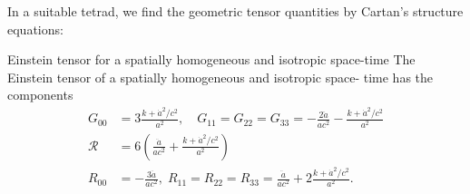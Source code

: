 In a suitable tetrad, we find the geometric tensor quantities by Cartan's structure equations:
\begin{mybox}{Einstein tensor for a spatially homogeneous and isotropic
		space-time}
The Einstein tensor of a spatially homogeneous and isotropic space-
time has the components
\begin{align}
	G_{00}&= 3\frac{k+\dot{a}^2/c^2}{a^2}, \quad G_{11}=G_{22}=G_{33} =-\frac{2 \ddot{a}}{a c^2}- \frac{k+\dot{a}^2/c^2}{a^2} \\
	\mathcal{R} &= 6 \left(\frac{\ddot{a}}{a c^2} + \frac{k+\dot{a}^2/c^2}{a^2}\right)\\
	R_{00}& =- \frac{3 \ddot{a}}{a c^2}, \; R_{11}=R_{22}=R_{33}=\frac{\ddot{a}}{a c^2} + 2\frac{k+\dot{a}^2/c^2}{a^2}.
\end{align}
\end{mybox}
